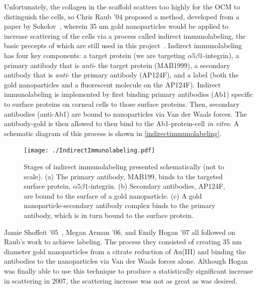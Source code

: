 Unfortunately, the collagen in the scaffold scatters too highly for the OCM to distinguish the cells, so Chris Raub '04 proposed a method, developed from a paper by Sokolov~\citep{Sokolov}, wherein 35 nm gold nanoparticles would be applied to increase scattering of the cells via a process called indirect immunolabeling, the basic precepts of which are still used in this project~\citep{raub}. Indirect immunolabeling has four key components: a target protein (we are targeting $\alpha 5 \beta 1$-integrin), a primary antibody that is \emph{anti}- the target protein (MAB1999), a secondary antibody that is \emph{anti}- the primary antibody (AP124F), and a label (both the gold nanoparticles and a fluorescent molecule on the AP124F). Indirect immunolabeling is implemented by first binding primary antibodies (Ab1) specific to surface proteins on corneal cells to those surface proteins. Then, secondary antibodies (anti-Ab1) are bound to nanoparticles via Van der Waals forces. The antibody-gold is then allowed to then bind to the Ab1-protein-cell \emph{in vitro}. A schematic diagram of this process is shown in \autoref{indirectimmunolabeling}.

\begin{figure}[htbp]
\centering
\texttt{[image: ./IndirectImmunolabeling.pdf]}
\caption{Stages of indirect immunolabeling presented schematically (not to scale). (a) The primary antibody, MAB199, binds to the targeted surface protein, $\alpha 5 \beta 1$-integrin. (b) Secondary antibodies, AP124F, are bound to the surface of a gold nanoparticle. (c) A gold nanoparticle-secondary antibody complex binds to the primary antibody, which is in turn bound to the surface protein.}
\label{indirectimmunolabeling}
\end{figure}



Jamie Shoffeit '05~\citep{chanshoffeit}, Megan Arman '06, and Emily Hogan '07 all followed on Raub's work to achieve labeling. The process they consisted of creating 35 nm diameter gold nanoparticles from a citrate reduction of Au(III) and binding the antibodies to the nanoparticles via Van der Waals forces alone. Although Hogan was finally able to use this technique to produce a statistically significant increase in scattering in 2007, the scattering increase was not as great as was desired.

